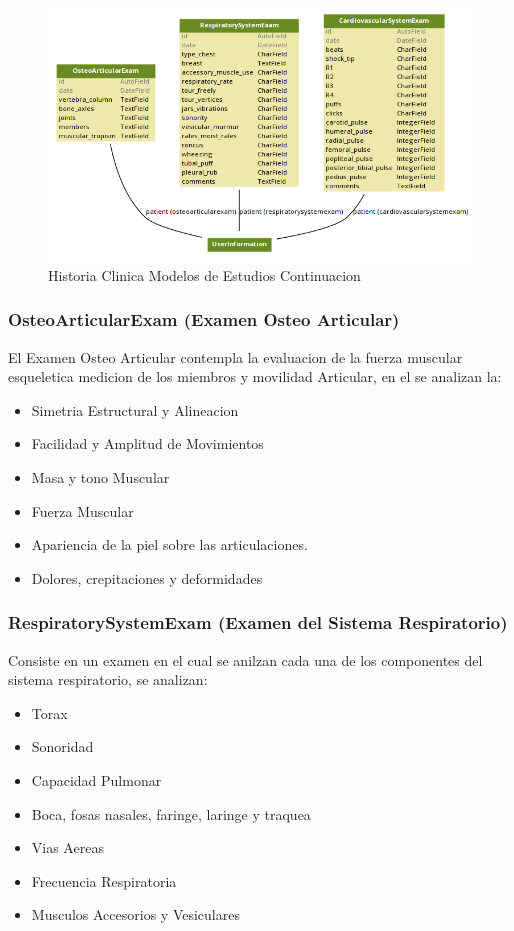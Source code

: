 \begin{figure}[H]
    \centering
    \includegraphics[scale=0.5]{resourse/hc4.png}
    \caption{Historia Clinica Modelos de Estudios Continuacion}
    \label{fig:hc3}
\end{figure} 


\subsubsection{OsteoArticularExam (Examen Osteo Articular)}

El Examen Osteo Articular contempla la evaluacion de la fuerza muscular esqueletica
medicion de los miembros y movilidad Articular, en el se analizan la:

\begin{itemize}
    \item Simetria Estructural y Alineacion
    \item Facilidad y Amplitud de Movimientos
    \item Masa y tono Muscular
    \item Fuerza Muscular
    \item Apariencia de la piel sobre las articulaciones.
    \item Dolores, crepitaciones y deformidades
\end{itemize}

\subsubsection{RespiratorySystemExam (Examen del Sistema Respiratorio)}

Consiste en un examen en el cual se anilzan cada una de los componentes del 
sistema respiratorio, se analizan:

\begin{itemize}
    \item Torax
    \item Sonoridad
    \item Capacidad Pulmonar
    \item Boca, fosas nasales, faringe, laringe y traquea 
    \item Vias Aereas
    \item Frecuencia Respiratoria
    \item Musculos Accesorios y Vesiculares
\end{itemize}

